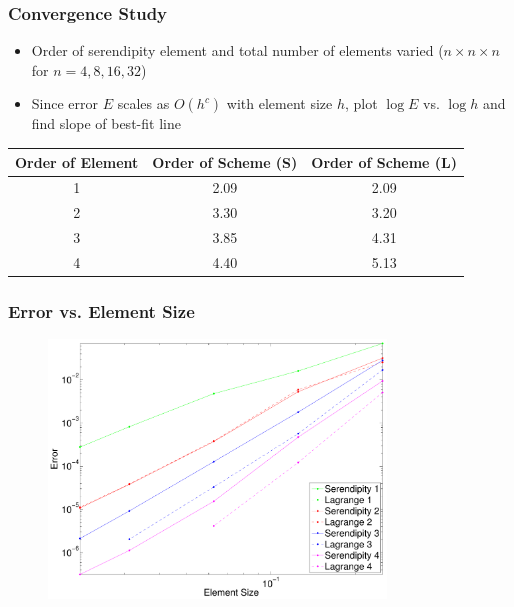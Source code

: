 \documentclass[serif,12pt]{beamer}
\begin{document}
\begin{frame}
\frametitle{Convergence Study}
	\begin{itemize}
		\item Order of serendipity element and total number of elements varied ($n\times n\times n$ for $n=4,8,16,32$)
		\item Since error $E$ scales as $O(h^c)$ with element size $h$, plot $\log E$ vs. $\log h$ and find slope of best-fit line
	\end{itemize}
	\begin{center}
	\begin{tabular}{c|c|c}
		Order of Element & Order of Scheme (S) & Order of Scheme (L) \\
		\hline
		1 & 2.09 & 2.09 \\
		2 & 3.30 & 3.20 \\
		3 & 3.85 & 4.31\\
		4 & 4.40 & 5.13
	\end{tabular}
	\end{center}
\end{frame}

\begin{frame}
\frametitle{Error vs. Element Size}
\begin{figure}
    \includegraphics[width=0.8\textwidth]{figures/serendipityError.pdf}
\end{figure}
\end{frame}
\end{document}
